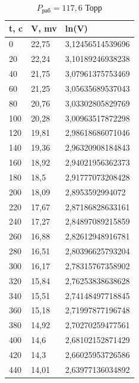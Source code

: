 \documentclass[12pt]{article}
\begin{document}
\begin{table}[H]
	\centering
	\begin{tabular}{|l|l|l|}
		\hline
		t, c & V, mv & ln(V)            \\ \hline
		0    & 22,75 & 3,12456514539696 \\ \hline
		20   & 22,24 & 3,10189246938238 \\ \hline
		40   & 21,75 & 3,07961375753469 \\ \hline
		60   & 21,25 & 3,05635689537043 \\ \hline
		80   & 20,76 & 3,03302805829769 \\ \hline
		100  & 20,28 & 3,00963517872298 \\ \hline
		120  & 19,81 & 2,98618686071046 \\ \hline
		140  & 19,36 & 2,96320908184843 \\ \hline
		160  & 18,92 & 2,94021956362373 \\ \hline
		180  & 18,5  & 2,91777073208428 \\ \hline
		200  & 18,09 & 2,8953592994072  \\ \hline
		220  & 17,67 & 2,87186828633161 \\ \hline
		240  & 17,27 & 2,84897089215859 \\ \hline
		260  & 16,88 & 2,82612948916781 \\ \hline
		280  & 16,51 & 2,80396625793204 \\ \hline
		300  & 16,17 & 2,78315767358902 \\ \hline
		320  & 15,84 & 2,76253838638628 \\ \hline
		340  & 15,51 & 2,74148497718845 \\ \hline
		360  & 15,18 & 2,71997877196748 \\ \hline
		380  & 14,92 & 2,70270259477561 \\ \hline
		400  & 14,6  & 2,68102152871429 \\ \hline
		420  & 14,3  & 2,66025953726586 \\ \hline
		440  & 14,01 & 2,63977136034892 \\ \hline
	\end{tabular}
	\caption{$P_\text{раб} = 117,6$ Торр}
\end{table}
\end{document}

